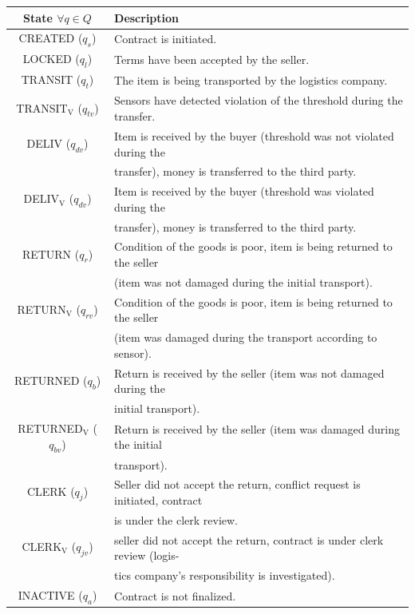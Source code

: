 \begin{table}[H]
\begin{tabular}{| c | l |}
\hline
\textbf{State} $\forall q \in Q$& \textbf{Description}\\
\hline
{\tiny CREATED} ($q_{s}$)&  Contract is initiated. \\
{\tiny LOCKED} ($q_{l}$)&  Terms have been accepted by the seller.\\
{\tiny TRANSIT} ($q_{t}$)&  The item is being transported by the logistics company. \\
{\tiny TRANSIT$_\mathrm{V}$} ($q_{tv}$)&  Sensors have detected violation of the threshold during the transfer.\\
{\tiny DELIV} ($q_{dv}$)&  Item is received by the buyer (threshold was not violated during the \\ & transfer), money is transferred to the third party. \\
{\tiny DELIV$_\mathrm{V}$} ($q_{dv}$)&  Item is received by the buyer (threshold was violated during the \\ & transfer), money is transferred to the third party.\\
{\tiny RETURN} ($q_{r}$)&  Condition of the goods is poor, item is being returned to the seller \\ & (item was not damaged during the initial transport). \\
{\tiny RETURN$_\mathrm{V}$} ($q_{rv}$)& Condition of the goods is poor, item is being returned to the seller \\ & (item was damaged during the transport according to sensor). \\
{\tiny RETURNED} ($q_{b}$)&  Return is received by the seller (item was not damaged during the \\ & initial transport). \\
{\tiny RETURNED$_\mathrm{V}$} ($q_{bv}$)& Return is received by the seller (item was damaged during the initial \\ & transport). \\
{\tiny CLERK} ($q_{j}$)& Seller did not accept the return, conflict request is initiated, contract \\ & is under the clerk review. \\
{\tiny CLERK$_\mathrm{V}$} ($q_{jv}$)& seller did not accept the return, contract is under clerk review (logis- \\ & tics company's responsibility is investigated). \\
{\tiny INACTIVE} ($q_{a}$)&  Contract is not finalized.  \\

\end{tabular}
\end{table}
